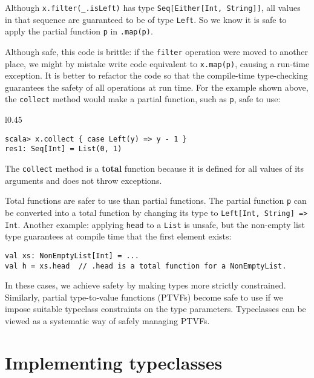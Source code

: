 \noindent Although \lstinline!x.filter(_.isLeft)! has type \lstinline!Seq[Either[Int, String]]!,
all values in that sequence are guaranteed to be of type \lstinline!Left!.
So we know it is safe to apply the partial function \lstinline!p!
in \lstinline!.map(p)!. 

Although safe, this code is brittle: if the \lstinline!filter! operation
were moved to another place, we might by mistake write code equivalent
to \lstinline!x.map(p)!, causing a run-time exception. It is better
to refactor the code so that the compile-time type-checking guarantees
the safety of all operations at run time. For the example shown above,
the \lstinline!collect! method would make a partial function, such
as \lstinline!p!, safe to use:

\begin{wrapfigure}{l}{0.45\columnwidth}%
\vspace{-0.75\baselineskip}
\begin{lstlisting}
scala> x.collect { case Left(y) => y - 1 }
res1: Seq[Int] = List(0, 1)
\end{lstlisting}

\vspace{-0.75\baselineskip}
\end{wrapfigure}%

\noindent The \lstinline!collect! method is a \textbf{total}
function because it is defined for all values of its arguments and
does not throw exceptions. 

Total functions are safer to use than partial functions. The partial
function \lstinline!p! can be converted into a total function by
changing its type to \lstinline!Left[Int, String] => Int!. Another
example: applying \lstinline!head! to a \lstinline!List! is unsafe,
but the non-empty list type guarantees at compile time that the first
element exists:
\begin{lstlisting}
val xs: NonEmptyList[Int] = ...
val h = xs.head  // .head is a total function for a NonEmptyList.
\end{lstlisting}
In these cases, we achieve safety by making types more strictly constrained.
Similarly, partial type-to-value functions (PTVFs) become safe to
use if we impose suitable typeclass constraints on the type parameters.
Typeclasses can be viewed as a systematic way of safely managing PTVFs.

\section{Implementing typeclasses}

